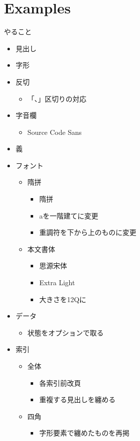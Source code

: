 \documentclass[a5paper,10pt]{article}
\begin{document}
\part{Examples}
やること
\begin{itemize}
\item{} 見出し
\item 字形
\item{} 反切
  \begin{itemize}
  \item{} 「、」区切りの対応
  \end{itemize}
\item{} 字音欄
  \begin{itemize}
  \item{} Source Code Sans
  \end{itemize}
\item{} 義
\item{} フォント
  \begin{itemize}
  \item{} 隋拼
    \begin{itemize}
    \item{} 隋拼
    \item{} aを一階建てに変更
    \item{} 重調符を下から上のものに変更
    \end{itemize}
  \item{} 本文書体
    \begin{itemize}
    \item{} 思源宋体
    \item{} Extra Light
    \item{} 大きさを12Qに
    \end{itemize}
  \end{itemize}
\item{} データ
  \begin{itemize}
  \item{} 状態をオプションで取る
  \end{itemize}
\item{} 索引
  \begin{itemize}
  \item{} 全体
    \begin{itemize}
    \item{} 各索引前改頁
    \item{} 重複する見出しを纏める
    \end{itemize}
  \item{} 四角
    \begin{itemize}
    \item{} 字形要素で纏めたものを再掲

\end{itemize}
\end{itemize}
\end{itemize}
\end{document}
